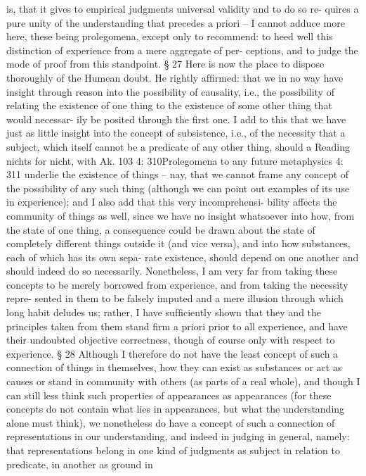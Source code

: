 is, that it gives to empirical judgments universal validity and to do so re-
quires a pure unity of the understanding that precedes a priori – I cannot
adduce more here, these being prolegomena, except only to recommend:
to heed well this distinction of experience from a mere aggregate of per-
ceptions, and to judge the mode of proof from this standpoint.
§ 27
Here is now the place to dispose thoroughly of the Humean doubt. He
rightly afﬁrmed: that we in no way have insight through reason into
the possibility of causality, i.e., the possibility of relating the existence
of one thing to the existence of some other thing that would necessar-
ily be posited through the ﬁrst one. I add to this that we have just as
little insight into the concept of subsistence, i.e., of the necessity that
a subject, which itself cannot be a predicate of any other thing, should
a
Reading nichts for nicht, with Ak.
103
4: 310Prolegomena to any future metaphysics
4: 311
underlie the existence of things – nay, that we cannot frame any concept
of the possibility of any such thing (although we can point out examples
of its use in experience); and I also add that this very incomprehensi-
bility affects the community of things as well, since we have no insight
whatsoever into how, from the state of one thing, a consequence could
be drawn about the state of completely different things outside it (and
vice versa), and into how substances, each of which has its own sepa-
rate existence, should depend on one another and should indeed do so
necessarily. Nonetheless, I am very far from taking these concepts to be
merely borrowed from experience, and from taking the necessity repre-
sented in them to be falsely imputed and a mere illusion through which
long habit deludes us; rather, I have sufﬁciently shown that they and the
principles taken from them stand ﬁrm a priori prior to all experience,
and have their undoubted objective correctness, though of course only
with respect to experience.
§ 28
Although I therefore do not have the least concept of such a connection
of things in themselves, how they can exist as substances or act as causes
or stand in community with others (as parts of a real whole), and though
I can still less think such properties of appearances as appearances (for
these concepts do not contain what lies in appearances, but what the
understanding alone must think), we nonetheless do have a concept of
such a connection of representations in our understanding, and indeed
in judging in general, namely: that representations belong in one kind
of judgments as subject in relation to predicate, in another as ground in

